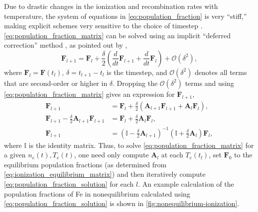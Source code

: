 Due to drastic changes in the ionization and recombination rates with temperature, the system of equations in \autoref{eq:population_fraction} is very ``stiff,'' making explicit schemes very sensitive to the choice of timestep \citep{macneice_numerical_1984,bradshaw_numerical_2009}. \autoref{eq:population_fraction_matrix} can be solved using an implicit ``deferred correction'' method \citep{npl_national_physical_laboratory_modern_1961}, as pointed out by \citet{macneice_numerical_1984},
\begin{equation}\label{eq:deferred_correction}
    \mathbf{F}_{l+1} = \mathbf{F}_{l} + \frac{\delta}{2}\left(\frac{d}{dt}\mathbf{F}_{l+1} + \frac{d}{dt}\mathbf{F}_l\right) + \mathcal{O}(\delta^2),
\end{equation}
where $\mathbf{F}_l=\mathbf{F}(t_l)$, $\delta = t_{l+1} - t_l$ is the timestep, and $\mathcal{O}(\delta^2)$ denotes all terms that are second-order or higher in $\delta$. Dropping the $\mathcal{O}(\delta^2)$ terms and using \autoref{eq:population_fraction_matrix} gives an expression for $\mathbf{F}_{l+1}$,
\begin{align}\label{eq:population_fraction_solution}
    \mathbf{F}_{l+1} &= \mathbf{F}_{l} + \frac{\delta}{2}\left(\mathbf{A}_{l+1}\mathbf{F}_{l+1} + \mathbf{A}_l\mathbf{F}_l\right), \nonumber \\
    \mathbf{F}_{l+1} - \frac{\delta}{2}\mathbf{A}_{l+1}\mathbf{F}_{l+1} &= \mathbf{F}_{l} + \frac{\delta}{2}\mathbf{A}_l\mathbf{F}_l, \nonumber \\
    \mathbf{F}_{l+1} &= \left(\mathbb{I} - \frac{\delta}{2}\mathbf{A}_{l+1}\right)^{-1}\left(\mathbb{I} + \frac{\delta}{2}\mathbf{A}_l\right)\mathbf{F}_l,
\end{align}
where $\mathbb{I}$ is the identity matrix. Thus, to solve \autoref{eq:population_fraction_matrix} for a given $n_e(t),T_e(t)$, one need only compute $\mathbf{A}_l$ at each $T_e(t_l)$, set $\mathbf{F}_0$ to the equilibrium population fractions (as determined from \autoref{eq:ionization_equilibrium_matrix}) and then iteratively compute \autoref{eq:population_fraction_solution} for each $l$. An example calculation of the population fractions of Fe in nonequilibrium calculated using \autoref{eq:population_fraction_solution} is shown in \autoref{fig:nonequilibrium-ionization}.

